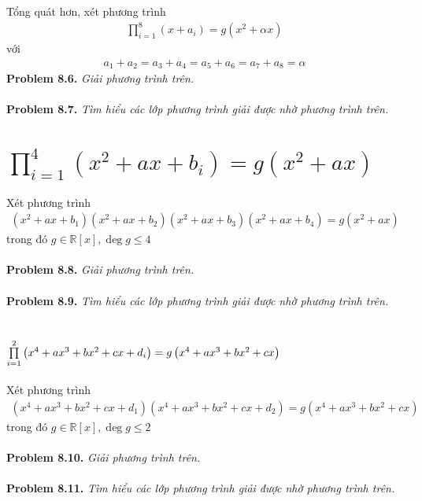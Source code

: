 \documentclass[a4paper,oneside]{book}
\numberwithin{equation}{chapter}
\begin{document}
Tổng quát hơn, xét phương trình
\begin{align}
\prod\limits_{i = 1}^8 {\left( {x + {a_i}} \right)}  = g\left( {{x^2} + \alpha x} \right)
\end{align}
với 
\begin{align}
{a_1} + {a_2} = {a_3} + {a_4} = {a_5} + {a_6} = {a_7} + {a_8} = \alpha
\end{align}
\textbf{Problem 8.6.} \textit{Giải phương trình trên.}\\
\\
\textbf{Problem 8.7.} \textit{Tìm hiểu các lớp phương trình giải được nhờ phương trình trên.}
\section{$\prod\limits_{i = 1}^4 {\left( {{x^2} + ax + {b_i}} \right)}  = g\left( {{x^2} + ax} \right)$}
Xét phương trình
\begin{align}
\left( {{x^2} + ax + {b_1}} \right)\left( {{x^2} + ax + {b_2}} \right)\left( {{x^2} + ax + {b_3}} \right)\left( {{x^2} + ax + {b_4}} \right) = g\left( {{x^2} + ax} \right)
\end{align}
trong đó $g \in \mathbb{R} \left[ x \right],\deg g \le 4$\\
\\
\textbf{Problem 8.8.} \textit{Giải phương trình trên.}\\
\\
\textbf{Problem 8.9.} \textit{Tìm hiểu các lớp phương trình giải được nhờ phương trình trên.}
\section{$\prod\limits_{i = 1}^2 {\left( {{x^4} + a{x^3} + b{x^2} + cx + {d_i}} \right)}  \\= g\left( {{x^4} + a{x^3} + b{x^2} + cx} \right)$}
Xét phương trình
\begin{align}
\left( {{x^4} + a{x^3} + b{x^2} + cx + {d_1}} \right)\left( {{x^4} + a{x^3} + b{x^2} + cx + {d_2}} \right) = g\left( {{x^4} + a{x^3} + b{x^2} + cx} \right)
\end{align}
trong đó $g \in \mathbb{R} \left[ x \right],\deg g \le 2$\\
\\
\textbf{Problem 8.10.} \textit{Giải phương trình trên.}\\
\\
\textbf{Problem 8.11.} \textit{Tìm hiểu các lớp phương trình giải được nhờ phương trình trên.}
\end{document}

